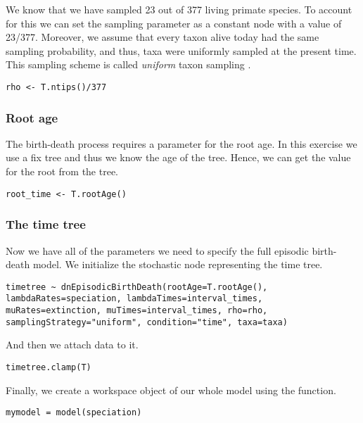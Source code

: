 We know that we have sampled 23 out of 377 living primate species. 
To account for this we can set the sampling parameter as a constant node with a value of 23/377.
Moreover, we assume that every taxon alive today had the same sampling probability, and thus, taxa were uniformly sampled at the present time.
This sampling scheme is called \emph{uniform} taxon sampling \citep{Hoehna2011,Hoehna2014a}.
{\tt \begin{snugshade*}
\begin{lstlisting}
rho <- T.ntips()/377
\end{lstlisting}
\end{snugshade*}}


\subsubsection{Root age}

The birth-death process requires a parameter for the root age.
In this exercise we use a fix tree and thus we know the age of the tree.
Hence, we can get the value for the root from the tree.
{\tt \begin{snugshade*}
\begin{lstlisting}
root_time <- T.rootAge()
\end{lstlisting}
\end{snugshade*}}

\subsubsection{The time tree}

Now we have all of the parameters we need to specify the full episodic birth-death model. 
We initialize the stochastic node representing the time tree.
{\tt \begin{snugshade*}
\begin{lstlisting}
timetree ~ dnEpisodicBirthDeath(rootAge=T.rootAge(), lambdaRates=speciation, lambdaTimes=interval_times, muRates=extinction, muTimes=interval_times, rho=rho, samplingStrategy="uniform", condition="time", taxa=taxa)
\end{lstlisting}
\end{snugshade*}}
And then we attach data to it.
{\tt \begin{snugshade*}
\begin{lstlisting}
timetree.clamp(T)
\end{lstlisting}
\end{snugshade*}}

Finally, we create a workspace object of our whole model using the  function. 
{\tt \begin{snugshade*}
\begin{lstlisting}
mymodel = model(speciation)
\end{lstlisting}
\end{snugshade*}}

